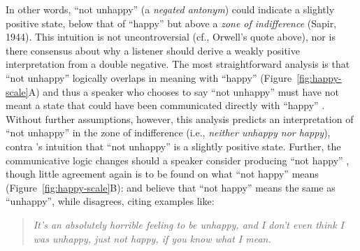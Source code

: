 \documentclass[floatsintext,doc]{apa6}
\begin{document}
In other words, \enquote{not unhappy} (a \emph{negated antonym}) could indicate a slightly positive state, below that of \enquote{happy}  but above a \emph{zone of indifference} (Sapir, 1944). %
This intuition is not uncontroversial (cf., Orwell's quote above), nor is there consensus about why a listener should derive a weakly positive interpretation from a double negative.
The most straightforward analysis is that \enquote{not unhappy}  logically overlaps in meaning with \enquote{happy} (Figure~\ref{fig:happy-scale}A) and thus a speaker who chooses to say \enquote{not unhappy} must have not meant a state that could have been communicated directly with \enquote{happy} \cite{Horn1991:Duplex}. 
Without further assumptions, however, this analysis predicts an interpretation of \enquote{not unhappy} in the zone of indifference (i.e., \emph{neither unhappy nor happy}), contra 's intuition that \enquote{not unhappy} is a slightly positive state.
Further, the communicative logic changes should a speaker consider producing \enquote{not happy} \cite{Blutner2004:pragmatics}, though little agreement again is to be found on what \enquote{not happy} means (Figure~\ref{fig:happy-scale}B):  and  believe that \enquote{not happy} means the same as \enquote{unhappy}, while  disagrees, citing examples like:

\begin{quote}
\emph{It's an absolutely horrible feeling to be unhappy, and I don't even think I was unhappy, just not happy, if you know what I mean.} %
\end{quote}

%
%
%
%
\end{document}
